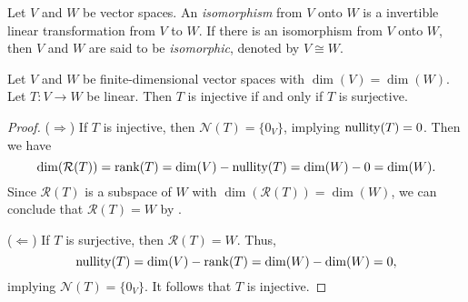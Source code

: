 \begin{definition}
  \label{def:isomorphism}
  Let $V$ and $W$ be vector spaces.
  An \emph{isomorphism} from $V$ onto $W$ is a invertible linear transformation
  from $V$ to $W$.
  If there is an isomorphism from $V$ onto $W$, then $V$ and $W$ are said to be
  \emph{isomorphic}, denoted by $V \cong W$.
\end{definition}

\begin{lemma}
  \label{lem:same-dimension}
  Let $V$ and $W$ be finite-dimensional vector spaces with $\dim(V) = \dim(W)$.
  Let $T: V \to W$ be linear.
  Then $T$ is injective if and only if $T$ is surjective.
\end{lemma}
\begin{proof}
  ($\Rightarrow$)
  If $T$ is injective, then $\mathcal{N}(T) = \{0_V\}$, implying
  $\operatorname{nullity}(T) = 0$.
  Then we have
  \begin{equation*}
    \dim(\mathcal{R}(T))
    = \operatorname{rank}(T)
    = \dim(V) - \operatorname{nullity}(T)
    = \dim(W) - 0
    = \dim(W).
  \end{equation*}
  Since $\mathcal{R}(T)$ is a subspace of $W$ with
  $\dim(\mathcal{R}(T)) = \dim(W)$, we can conclude that $\mathcal{R}(T) = W$
  by .

  ($\Leftarrow$)
  If $T$ is surjective, then $\mathcal{R}(T) = W$.
  Thus,
  \begin{equation*}
    \operatorname{nullity}(T)
    = \dim(V) - \operatorname{rank}(T)
    = \dim(W) - \dim(W)
    = 0,
  \end{equation*}
  implying $\mathcal{N}(T) = \{0_V\}$.
  It follows that $T$ is injective.
\end{proof}

